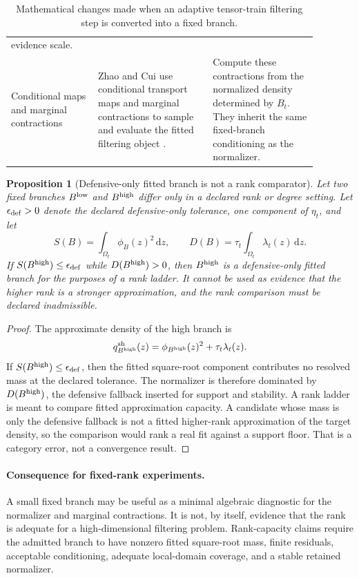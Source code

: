 \documentclass[11pt]{article}
\newtheorem{proposition}{Proposition}
\numberwithin{equation}{section}
\newcommand{\dd}{\,\mathrm d}
\begin{document}
\begin{table}[htbp]
\begin{tabular}{p{0.25\linewidth}p{0.33\linewidth}p{0.30\linewidth}}
evidence scale.\\
\addlinespace
Conditional maps and marginal contractions &
Zhao and Cui use conditional transport maps and marginal contractions to sample
and evaluate the fitted filtering object
\cite[Proposition~2 and Section~3.2]{zhao2024ttsequential}. &
Compute these contractions from the normalized density determined by \(B_t\).
They inherit the same fixed-branch conditioning as the normalizer.\\
\bottomrule
\end{tabular}
\caption{Mathematical changes made when an adaptive tensor-train filtering step
is converted into a fixed branch.}
\label{tab:p50-adaptive-vs-fixed-branch}
\end{table}

\begin{proposition}[Defensive-only fitted branch is not a rank comparator]
\label{prop:p50-defensive-only-rank-veto}
Let two fixed branches \(B^{\rm low}\) and \(B^{\rm high}\) differ only in a
declared rank or degree setting.  Let \(\epsilon_{\rm def}>0\) denote the
declared defensive-only tolerance, one component of \(\eta_t\), and let
\[
    S(B)=\int_{\Omega_t}\phi_B(z)^2\dd z,\qquad
    D(B)=\tau_t\int_{\Omega_t}\lambda_t(z)\dd z.
\]
If \(S(B^{\rm high})\le\epsilon_{\rm def}\) while
\(D(B^{\rm high})>0\), then \(B^{\rm high}\) is a defensive-only fitted
branch for the purposes of a rank ladder.  It cannot be used as evidence
that the higher rank is a stronger approximation, and the rank comparison must
be declared inadmissible.
\end{proposition}

\begin{proof}
The approximate density of the high branch is
\[
    q_{B^{\rm high}}^{\rm sh}(z)
    =
    \phi_{B^{\rm high}}(z)^2+\tau_t\lambda_t(z).
\]
If \(S(B^{\rm high})\le\epsilon_{\rm def}\), then the fitted square-root
component contributes no resolved mass at the declared tolerance.  The
normalizer is therefore dominated by \(D(B^{\rm high})\), the defensive
fallback inserted for support and stability.  A rank ladder is meant to compare
fitted approximation capacity.  A candidate whose mass is only the defensive
fallback is not a fitted higher-rank approximation of the target density, so the
comparison would rank a real fit against a support floor.  That is a category
error, not a convergence result.
\end{proof}

\paragraph{Consequence for fixed-rank experiments.}
A small fixed branch may be useful as a minimal algebraic diagnostic for the
normalizer and marginal contractions.  It is not, by itself, evidence that the
rank is adequate for a high-dimensional filtering problem.  Rank-capacity
claims require the admitted branch to have nonzero fitted square-root mass,
finite residuals, acceptable conditioning, adequate local-domain coverage, and
a stable retained normalizer.
\end{document}
